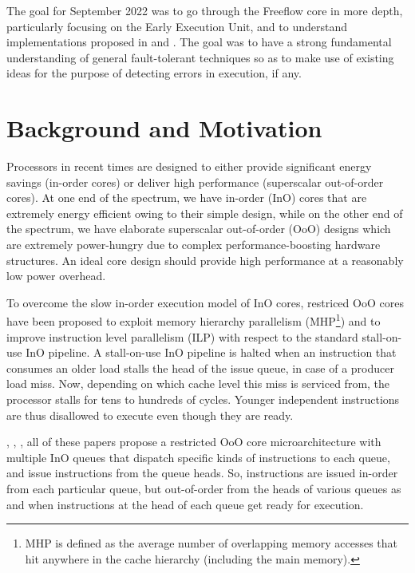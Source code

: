 \documentclass[a4paper,12pt, final]{report}
\begin{document}
The goal for September 2022 was to go through the Freeflow core in more depth, particularly focusing on the Early Execution Unit, and to understand implementations proposed in \cite{remo} and \cite{remora}. The goal was to have a strong fundamental understanding of general fault-tolerant techniques so as to make use of existing ideas for the purpose of detecting errors in execution, if any.

\section{Background and Motivation}

Processors in recent times are designed to either provide significant energy savings (in-order cores) or deliver high performance (superscalar out-of-order cores). At one end of the spectrum, we have in-order (InO) cores that are extremely energy efficient owing to their simple design, while on the other end of the spectrum, we have elaborate superscalar out-of-order (OoO) designs which are extremely power-hungry due to complex performance-boosting hardware structures. An ideal core design should provide high performance at a reasonably low power overhead.

To overcome the slow in-order execution model of InO cores, restriced OoO cores have been proposed to exploit memory hierarchy parallelism (MHP\footnote[1]{MHP is defined as the average number of overlapping memory accesses that hit anywhere in the cache hierarchy (including the main memory).}) and to improve instruction level parallelism (ILP) with respect to the standard stall-on-use InO pipeline. A stall-on-use InO pipeline is halted when an instruction that consumes an older load stalls the head of the issue queue, in case of a producer load miss. Now, depending on which cache level this miss is serviced from, the processor stalls for tens to hundreds of cycles. Younger independent instructions are thus disallowed to execute even though they are ready.

\cite{loadslice}, \cite{forwardslice}, \cite{freeflow}, all of these papers propose a restricted OoO core microarchitecture with multiple InO queues that dispatch specific kinds of instructions to each queue, and issue instructions from the queue heads. So, instructions are issued in-order from each particular queue, but out-of-order from the heads of various queues as and when instructions at the head of each queue get ready for execution.
\end{document}
